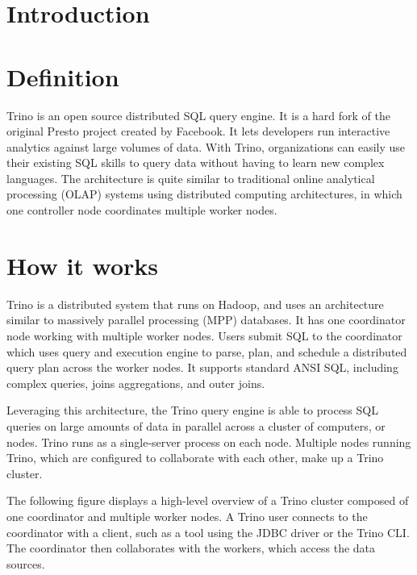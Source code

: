 
\section*{Introduction}

\section{Definition}
Trino is an open source distributed SQL query engine. It is a hard fork of the original Presto project created by Facebook. It lets developers run interactive analytics against large volumes of data. With Trino, organizations can easily use their existing SQL skills to query data without having to learn new complex languages. The architecture is quite similar to traditional online analytical processing (OLAP) systems using distributed computing architectures, in which one controller node coordinates multiple worker nodes.

\section{How it works}
Trino is a distributed system that runs on Hadoop, and uses an architecture similar to massively parallel processing (MPP) databases. It has one coordinator node working with multiple worker nodes. Users submit SQL to the coordinator which uses query and execution engine to parse, plan, and schedule a distributed query plan across the worker nodes. It supports standard ANSI SQL, including complex queries, joins aggregations, and outer joins.

Leveraging this architecture, the Trino query engine is able to process SQL queries on large amounts of data in parallel across a cluster of computers, or nodes. Trino runs as a single-server process on each node. Multiple nodes running Trino, which are configured to collaborate with each other, make up a Trino cluster.

The following figure displays a high-level overview of a Trino cluster composed of one coordinator and multiple worker nodes. A Trino user connects to the coordinator with a client, such as a tool using the JDBC driver or the Trino CLI. The coordinator then collaborates with the workers, which access the data sources.

